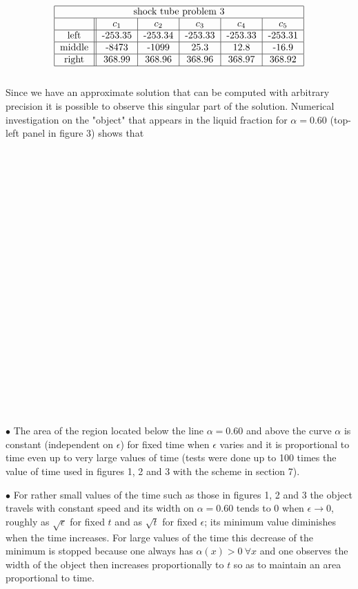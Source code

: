 \documentclass[a4paper,12pt]{article}
\begin{document}
\begin{displaymath}
\begin{tabular}{|c||c|c|c|c|c|}
\hline
\multicolumn{6}{|c|}{shock tube problem 3}\\
\hline 
     &$ c_1$&$c_2$&$c_3$&$c_4$&$c_5$\\   
 \hline
left& -253.35 & -253.34 & -253.33 &-253.33  &-253.31\\
 \hline
middle& -8473&-1099&25.3&12.8&-16.9\\
 \hline
right& 368.99&368.96& 368.96& 368.97&368.92\\
 \hline

 \end{tabular} \end{displaymath}
 \\     
 Since we have an approximate solution that can be computed with arbitrary precision it is possible to observe this singular part of the solution. Numerical investigation on the "object" that appears in the liquid fraction for $\alpha=0.60$ (top-left panel in figure 3) shows that \\
\\
\\
\\
\\
\\
\\
\\
\\
\\
\\
\\
\\
\\
\\
\\
\\
\\
\\
\\
\\
\\
$\bullet$ The area of the region located below the line $\alpha=0.60$ and above the curve $\alpha$ is  constant (independent on $\epsilon$) for fixed time when $\epsilon$ varies and it is proportional to time even up to very large values of time (tests were done up to 100 times the value of time used in figures 1, 2 and 3 with the scheme in  section 7).

$\bullet$ For rather small values of the time such as those in figures 1, 2 and 3 the object travels with constant speed and  its width on $\alpha=0.60$ tends to 0 when $\epsilon\rightarrow 0$, roughly as  $\sqrt\epsilon$ for fixed $t$ and as $\sqrt t$ for fixed $\epsilon$;  its minimum value diminishes when the time increases. For large values of the time this decrease of the minimum is stopped because one always has $\alpha(x)>0 \  \forall x$ and one observes the width of the object then increases proportionally to $t$ so as to maintain an area proportional to time.
\end{document}

